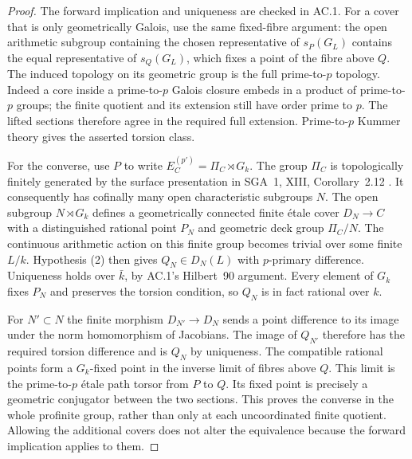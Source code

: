 \begin{proof}
The forward implication and uniqueness are checked in AC.1.  For a cover
that is only geometrically Galois, use the same fixed-fibre argument:
the open arithmetic subgroup containing the chosen representative of
$s_P(G_L)$ contains the equal representative of $s_Q(G_L)$, which fixes a
point of the fibre above $Q$.  The induced topology on its geometric
group is the full prime-to-$p$ topology.  Indeed a core inside a
prime-to-$p$ Galois closure embeds in a product of prime-to-$p$ groups;
the finite quotient and its extension still have order prime to $p$.
The lifted sections therefore agree in the required full extension.
Prime-to-$p$ Kummer theory gives the asserted torsion class.

For the converse, use $P$ to write $E_C^{(p')}=\Pi_C\rtimes G_k$.
The group $\Pi_C$ is topologically finitely generated by the surface
presentation in SGA~1, XIII, Corollary~2.12 \cite{AR_SGA1}.
It consequently has cofinally many open characteristic subgroups $N$.
The open subgroup $N\rtimes G_k$ defines a geometrically connected
finite \'etale cover $D_N\to C$ with a distinguished rational point
$P_N$ and geometric deck group $\Pi_C/N$.  The continuous arithmetic
action on this finite group becomes trivial over some finite $L/k$.
Hypothesis (2) then gives $Q_N\in D_N(L)$ with $p$-primary difference.
Uniqueness holds over $\bar k$, by AC.1's Hilbert~90 argument.  Every
element of $G_k$ fixes $P_N$ and preserves the torsion condition, so
$Q_N$ is in fact rational over $k$.

For $N'\subset N$ the finite morphism $D_{N'}\to D_N$ sends a point
difference to its image under the norm homomorphism of Jacobians.  The
image of $Q_{N'}$ therefore has the required torsion difference and is
$Q_N$ by uniqueness.  The compatible rational points form a $G_k$-fixed
point in the inverse limit of fibres above $Q$.  This limit is the
prime-to-$p$ \'etale path torsor from $P$ to $Q$.  Its fixed point is
precisely a geometric conjugator between the two sections.  This proves
the converse in the whole profinite group, rather than only at each
uncoordinated finite quotient.  Allowing the additional covers does not
alter the equivalence because the forward implication applies to them.
\end{proof}

